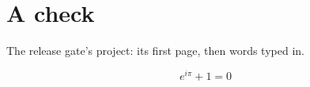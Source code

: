 \documentclass{article}
\begin{document}
\section{A check}
The release gate's project: its first page, then words typed in.



\begin{equation}
  e^{i\pi} + 1 = 0
\end{equation}
\end{document}
